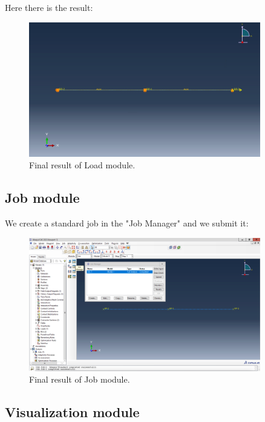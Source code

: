 \newpage

Here there is the result:
\begin{figure}[H]
    \centering
    \includegraphics[width=0.9\textwidth]{Images/ab1/a21.png}
    \caption{Final result of Load module.}
    \label{fig:a21}
\end{figure}

\subsection{Job module}
\label{job_module1}%

We create a standard job in the "Job Manager" and we submit it:
\begin{figure}[H]
    \centering
    \includegraphics[width=0.9\textwidth]{Images/ab1/a23.png}
    \caption{Final result of Job module.}
    \label{fig:a23}
\end{figure}

\newpage

\subsection{Visualization module}
\label{visualization_module1}%

